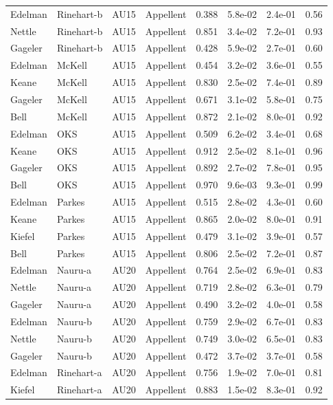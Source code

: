 \documentclass{monashthesis}
\begin{document}
\begin{center}
\begin{longtable}{llllllll}
Edelman & Rinehart-b & AU15 & Appellent & 0.388 & 5.8e-02 & 2.4e-01 & 0.56 \\
Nettle & Rinehart-b & AU15 & Appellent & 0.851 & 3.4e-02 & 7.2e-01 & 0.93 \\
Gageler & Rinehart-b & AU15 & Appellent & 0.428 & 5.9e-02 & 2.7e-01 & 0.60 \\
Edelman & McKell & AU15 & Appellent & 0.454 & 3.2e-02 & 3.6e-01 & 0.55 \\
Keane & McKell & AU15 & Appellent & 0.830 & 2.5e-02 & 7.4e-01 & 0.89 \\
Gageler & McKell & AU15 & Appellent & 0.671 & 3.1e-02 & 5.8e-01 & 0.75 \\
Bell & McKell & AU15 & Appellent & 0.872 & 2.1e-02 & 8.0e-01 & 0.92 \\
Edelman & OKS & AU15 & Appellent & 0.509 & 6.2e-02 & 3.4e-01 & 0.68 \\
Keane & OKS & AU15 & Appellent & 0.912 & 2.5e-02 & 8.1e-01 & 0.96 \\
Gageler & OKS & AU15 & Appellent & 0.892 & 2.7e-02 & 7.8e-01 & 0.95 \\
Bell & OKS & AU15 & Appellent & 0.970 & 9.6e-03 & 9.3e-01 & 0.99 \\
Edelman & Parkes & AU15 & Appellent & 0.515 & 2.8e-02 & 4.3e-01 & 0.60 \\
Keane & Parkes & AU15 & Appellent & 0.865 & 2.0e-02 & 8.0e-01 & 0.91 \\
Kiefel & Parkes & AU15 & Appellent & 0.479 & 3.1e-02 & 3.9e-01 & 0.57 \\
Bell & Parkes & AU15 & Appellent & 0.806 & 2.5e-02 & 7.2e-01 & 0.87 \\
Edelman & Nauru-a & AU20 & Appellent & 0.764 & 2.5e-02 & 6.9e-01 & 0.83 \\
Nettle & Nauru-a & AU20 & Appellent & 0.719 & 2.8e-02 & 6.3e-01 & 0.79 \\
Gageler & Nauru-a & AU20 & Appellent & 0.490 & 3.2e-02 & 4.0e-01 & 0.58 \\
Edelman & Nauru-b & AU20 & Appellent & 0.759 & 2.9e-02 & 6.7e-01 & 0.83 \\
Nettle & Nauru-b & AU20 & Appellent & 0.749 & 3.0e-02 & 6.5e-01 & 0.83 \\
Gageler & Nauru-b & AU20 & Appellent & 0.472 & 3.7e-02 & 3.7e-01 & 0.58 \\
Edelman & Rinehart-a & AU20 & Appellent & 0.756 & 1.9e-02 & 7.0e-01 & 0.81 \\
Kiefel & Rinehart-a & AU20 & Appellent & 0.883 & 1.5e-02 & 8.3e-01 & 0.92 \\

\end{longtable}
\end{center}
\end{document}
